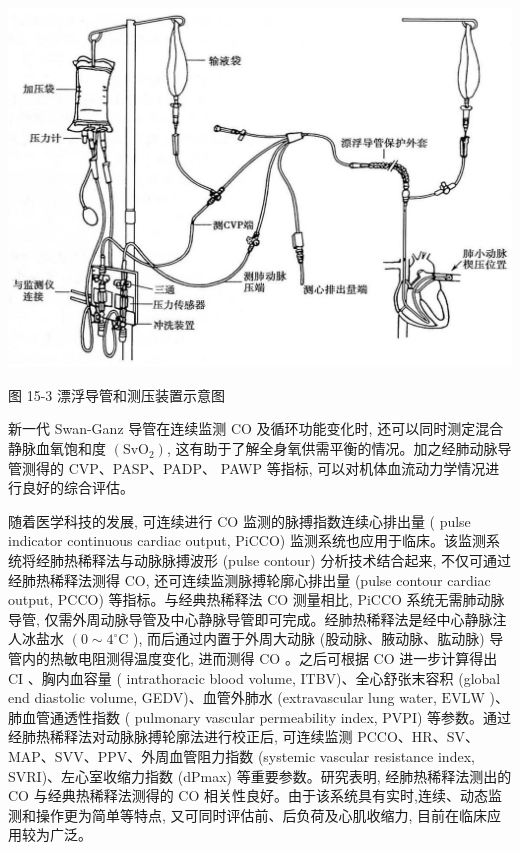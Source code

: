 \documentclass[10pt]{article}
\begin{document}
\begin{center}
\includegraphics[max width=\textwidth]{2024_07_09_002a177993bd97d1d6d7g-161}
\end{center}

图 15-3 漂浮导管和测压装置示意图

新一代 Swan-Ganz 导管在连续监测 CO 及循环功能变化时, 还可以同时测定混合静脉血氧饱和度 $\left(\mathrm{SvO}_{2}\right)$, 这有助于了解全身氧供需平衡的情况。加之经肺动脉导管测得的 CVP、PASP、PADP、 PAWP 等指标, 可以对机体血流动力学情况进行良好的综合评估。

随着医学科技的发展, 可连续进行 CO 监测的脉搏指数连续心排出量 ( pulse indicator continuous cardiac output, PiCCO) 监测系统也应用于临床。该监测系统将经肺热稀释法与动脉脉搏波形 (pulse contour) 分析技术结合起来, 不仅可通过经肺热稀释法测得 $\mathrm{CO}$, 还可连续监测脉搏轮廓心排出量 (pulse contour cardiac output, PCCO) 等指标。与经典热稀释法 CO 测量相比, PiCCO 系统无需肺动脉导管, 仅需外周动脉导管及中心静脉导管即可完成。经肺热稀释法是经中心静脉注人冰盐水 $\left(0 \sim 4^{\circ} \mathrm{C}\right.$ ), 而后通过内置于外周大动脉 (股动脉、腋动脉、肱动脉) 导管内的热敏电阻测得温度变化, 进而测得 $\mathrm{CO}$ 。之后可根据 $\mathrm{CO}$ 进一步计算得出 $\mathrm{CI}$ 、胸内血容量 ( intrathoracic blood volume, ITBV)、全心舒张末容积 (global end diastolic volume, GEDV)、血管外肺水 (extravascular lung water, $\mathrm{EVLW}$ )、肺血管通透性指数 ( pulmonary vascular permeability index, PVPI) 等参数。通过经肺热稀释法对动脉脉搏轮廓法进行校正后, 可连续监测 PCCO、HR、SV、MAP、SVV、PPV、外周血管阻力指数 (systemic vascular resistance index, SVRI)、左心室收缩力指数 (dPmax) 等重要参数。研究表明, 经肺热稀释法测出的 CO 与经典热稀释法测得的 CO 相关性良好。由于该系统具有实时,连续、动态监测和操作更为简单等特点, 又可同时评估前、后负荷及心肌收缩力, 目前在临床应用较为广泛。
\end{document}
